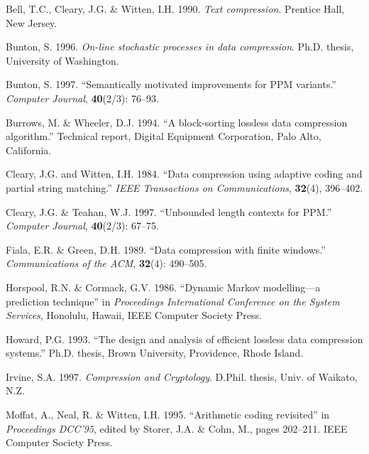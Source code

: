 \documentclass[11pt]{article}
\begin{document}
{\small
\begin{list}{}{\setlength{\parsep}{0.1 cm} \setlength{\rightmargin}{0 cm}
\setlength{\leftmargin}{0 cm}}
\baselineskip 13pt

\item []
Bell, T.C., Cleary, J.G. \& Witten, I.H. 1990.
{\em Text compression}.
Prentice Hall, New Jersey.

\item []
Bunton, S. 1996.
{\em On-line stochastic processes in data compression}.
Ph.D. thesis, University of Washington.

\item []
Bunton, S. 1997.
``Semantically motivated improvements for PPM variants.''
{\em Computer Journal}, {\bf 40}(2/3): 76--93.

\item []
Burrows, M. \& Wheeler, D.J. 1994.
``A block-sorting lossless data compression algorithm.''
Technical report, Digital Equipment Corporation, Palo Alto, California.

\item []
Cleary, J.G. and Witten, I.H. 1984.
``Data compression using adaptive coding and partial string matching.''
{\em IEEE Transactions on Communications}, {\bf 32}(4), 396--402.

\item []
Cleary, J.G. \& Teahan, W.J. 1997.
``Unbounded length contexts for PPM.''
{\em Computer Journal}, {\bf 40}(2/3): 67--75.

\item []
Fiala, E.R. \& Green, D.H. 1989.
``Data compression with finite windows.''
{\em Communications of the ACM}, {\bf 32}(4): 490--505.

\item []
Horspool, R.N. \& Cormack, G.V. 1986.
``Dynamic Markov modelling---a prediction technique'' in
{\em Proceedings International Conference on the System Services},
Honolulu, Hawaii, IEEE Computer Society Press.

\item []
Howard, P.G. 1993.
``The design and analysis of efficient lossless data compression systems.''
Ph.D. thesis, Brown University, Providence, Rhode Island.

\item []
Irvine, S.A. 1997. {\em Compression and Cryptology}. D.Phil. thesis,
Univ. of Waikato, N.Z.

\item []
Moffat, A., Neal, R. \& Witten, I.H. 1995.
``Arithmetic coding revisited'' in {\em Proceedings DCC'95},
edited by Storer, J.A. \& Cohn, M., pages 202--211. IEEE Computer Society
Press.


\end{list}}
\end{document}
